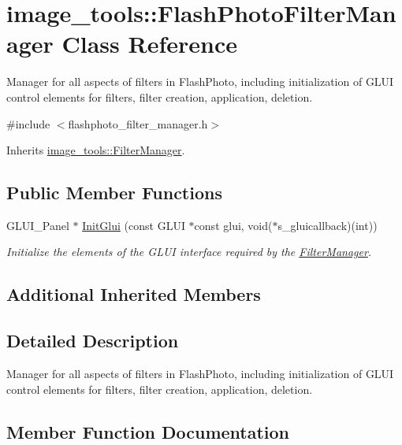 \hypertarget{classimage__tools_1_1FlashPhotoFilterManager}{}\section{image\+\_\+tools\+:\+:Flash\+Photo\+Filter\+Manager Class Reference}
\label{classimage__tools_1_1FlashPhotoFilterManager}


Manager for all aspects of filters in Flash\+Photo, including initialization of G\+L\+UI control elements for filters, filter creation, application, deletion.  




{\ttfamily \#include $<$flashphoto\+\_\+filter\+\_\+manager.\+h$>$}



Inherits \hyperlink{classimage__tools_1_1FilterManager}{image\+\_\+tools\+::\+Filter\+Manager}.

\subsection*{Public Member Functions}
\begin{DoxyCompactItemize}
\item 
G\+L\+U\+I\+\_\+\+Panel $\ast$ \hyperlink{classimage__tools_1_1FlashPhotoFilterManager_a4b9405a36d37d66dc2222d658bfceb98}{Init\+Glui} (const G\+L\+UI $\ast$const glui, void($\ast$s\+\_\+gluicallback)(int))
\begin{DoxyCompactList}\small\item\em Initialize the elements of the G\+L\+UI interface required by the \hyperlink{classimage__tools_1_1FilterManager}{Filter\+Manager}. \end{DoxyCompactList}\end{DoxyCompactItemize}
\subsection*{Additional Inherited Members}


\subsection{Detailed Description}
Manager for all aspects of filters in Flash\+Photo, including initialization of G\+L\+UI control elements for filters, filter creation, application, deletion. 

\subsection{Member Function Documentation}
